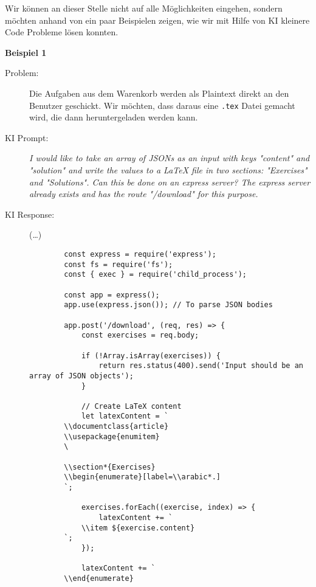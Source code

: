 Wir können an dieser Stelle nicht auf alle Möglichkeiten eingehen, sondern möchten anhand von ein paar Beispielen zeigen, wie wir mit Hilfe von KI kleinere Code Probleme lösen konnten.

\textbf{Beispiel 1} 
\begin{description}
    \item[Problem:] Die Aufgaben aus dem Warenkorb werden als Plaintext direkt an den Benutzer geschickt. Wir möchten, dass daraus eine \texttt{.tex} Datei gemacht wird, die dann heruntergeladen werden kann.
    \item[KI Prompt:] \emph{I would like to take an array of JSONs as an input with keys "content" and "solution" and write the values to a LaTeX file in two sections: "Exercises" and "Solutions". Can this be done on an express server? The express server already exists and has the route "/download" for this purpose.}
    \item[KI Response:] (\ldots)

    \begin{lstlisting}
        const express = require('express');
        const fs = require('fs');
        const { exec } = require('child_process');
        
        const app = express();
        app.use(express.json()); // To parse JSON bodies
        
        app.post('/download', (req, res) => {
            const exercises = req.body;
        
            if (!Array.isArray(exercises)) {
                return res.status(400).send('Input should be an array of JSON objects');
            }
        
            // Create LaTeX content
            let latexContent = `
        \\documentclass{article}
        \\usepackage{enumitem}
        \
        
        \\section*{Exercises}
        \\begin{enumerate}[label=\\arabic*.]
        `;
        
            exercises.forEach((exercise, index) => {
                latexContent += `
            \\item ${exercise.content}
        `;
            });
        
            latexContent += `
        \\end{enumerate}
        

\end{lstlisting}
\end{description}
